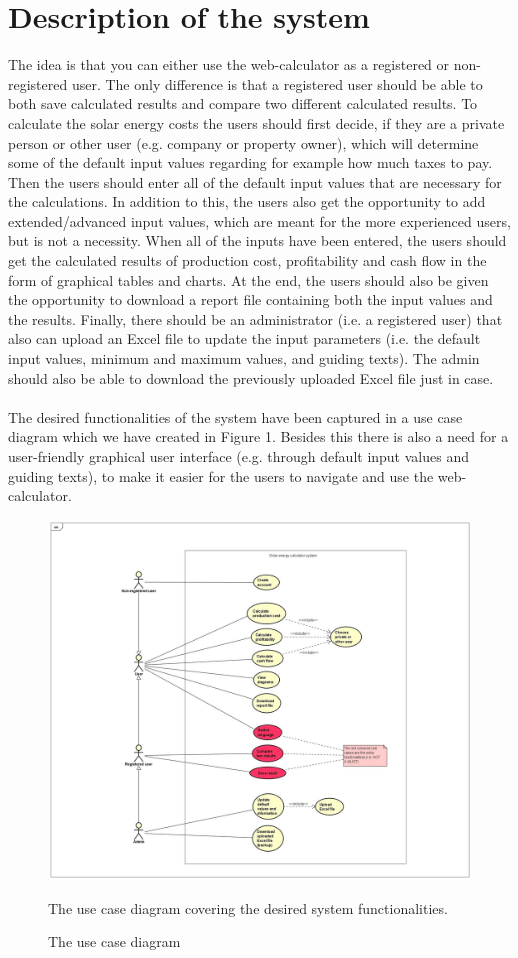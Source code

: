 \documentclass[]{article}
\begin{document}
\section{Description of the system}
The idea is that you can either use the web-calculator as a registered or non-
registered user. The only difference is that a registered user should be able
to both save calculated results and compare two different calculated results. To calculate the solar energy costs the users should first decide, if they are a private person or other user (e.g. company or property owner), which will determine some of the default input values regarding for example how much taxes to pay. Then the users should 
enter all of the default input values that are necessary for the calculations. In
addition to this, the users also get the opportunity to add extended/advanced
input values, which are meant for the more experienced users, but is not a necessity. When all of the inputs have been
entered, the users should get the calculated results of production cost,
profitability and cash flow in the form of graphical tables and charts.
At the end, the users should also be given the opportunity to download a report file
containing both the input values and the results. Finally, there should be an
administrator (i.e. a registered user) that also can upload an Excel file to update
the input parameters (i.e. the default input values, minimum and maximum
values, and guiding texts). The admin should also be able to download the previously uploaded Excel file just in case. 
\\\\
The desired functionalities of the system have been captured in a use case
diagram which we have created in Figure 1. Besides this there is also a need
for a user-friendly graphical user interface (e.g. through default input values
and guiding texts), to make it easier for the users to navigate and use the web-
calculator.

\begin{figure}[H]
\includegraphics[width=1.0\linewidth]{pic1}
\caption{The use case diagram}
\medskip
\small
The use case diagram covering the desired system functionalities. 
\label{fig:pic1}
\end{figure}
\end{document}
